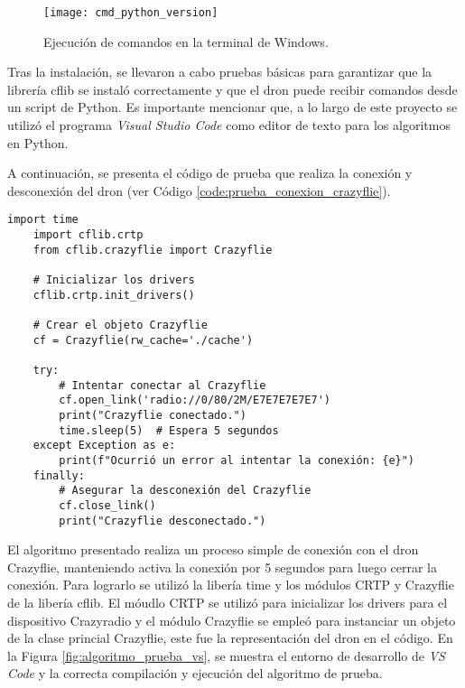 \vspace{0.5cm}
\begin{figure}[htbp]
	\centering
	\texttt{[image: cmd\_python\_version]}
	\caption{Ejecución de comandos en la terminal de Windows.}
	\label{fig:cmd_python_version}
\end{figure} 
\vspace{0.5cm}

Tras la instalación, se llevaron a cabo pruebas básicas para garantizar que la librería cflib se instaló correctamente y que el dron puede recibir comandos desde un script de Python. Es importante mencionar que, a lo largo de este proyecto se utilizó el programa \textit{Visual Studio Code} como editor de texto para los algoritmos en Python. 

A continuación, se presenta el código de prueba que realiza la conexión y desconexión del dron (ver Código \ref{code:prueba_conexion_crazyflie}). 

\newpage
\begin{lstlisting}[caption=Algoritmo de prueba en Python utilizando la librería Cflib., label=code:prueba_conexion_crazyflie]
	import time
	import cflib.crtp
	from cflib.crazyflie import Crazyflie
	
	# Inicializar los drivers
	cflib.crtp.init_drivers()
	
	# Crear el objeto Crazyflie
	cf = Crazyflie(rw_cache='./cache')
	
	try:
		# Intentar conectar al Crazyflie
		cf.open_link('radio://0/80/2M/E7E7E7E7E7')
		print("Crazyflie conectado.")
		time.sleep(5)  # Espera 5 segundos
	except Exception as e:
		print(f"Ocurrió un error al intentar la conexión: {e}")
	finally:
		# Asegurar la desconexión del Crazyflie
		cf.close_link()
		print("Crazyflie desconectado.")
\end{lstlisting}

El algoritmo presentado realiza un proceso simple de conexión con el dron Crazyflie, manteniendo activa la conexión por 5 segundos para luego cerrar la conexión. Para lograrlo se utilizó la libería time y los módulos CRTP y Crazyflie de la libería cflib. El móudlo CRTP se utilizó para inicializar los drivers para el dispositivo Crazyradio y el módulo Crazyflie se empleó para instanciar un objeto de la clase princial Crazyflie, este fue la representación del dron en el código. En la Figura \ref{fig:algoritmo_prueba_vs}, se muestra el entorno de desarrollo de \textit{VS Code} y la correcta compilación y ejecución del algoritmo de prueba. 

